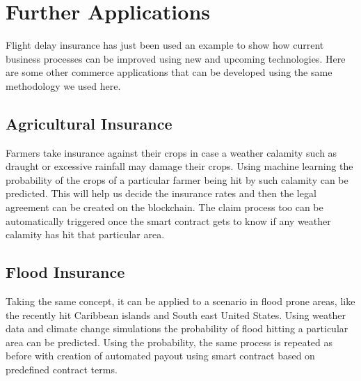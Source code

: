 \section{Further Applications}
Flight delay insurance has just been used an example to show how current business processes can be improved using new and upcoming technologies. Here are some other commerce applications that can be developed using the same methodology we used here.

\subsection{Agricultural Insurance}
Farmers take insurance against their crops in case a weather calamity such as draught or excessive rainfall may damage their crops. Using machine learning the probability of the crops of a particular farmer being hit by such calamity can be predicted. This will help us decide the insurance rates and then the legal agreement can be created on the blockchain. The claim process too can be automatically triggered once the smart contract gets to know if any weather calamity has hit that particular area.

\subsection{Flood Insurance}
Taking the same concept, it can be applied to a scenario in flood prone areas, like the recently hit Caribbean islands and South east United States. Using weather data and climate change simulations the probability of flood hitting a particular area can be predicted. Using the probability, the same process is repeated as before with creation of automated payout using smart contract based on predefined contract terms.